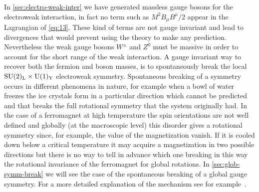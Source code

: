 In \cref{sec:electro-weak-inter} we have generated massless gauge bosons for the
electroweak interaction, in fact no term such as $M^{2} B_{\mu}B^{\mu} / 2$
appear in the Lagrangian of \cref{eq:13}. These kind of terms are not gauge
invariant and lead to divergences that would prevent using the theory to make
any prediction. Nevertheless the weak gauge bosons $W^\pm$ and $Z^0$ must be
massive in order to account for the short range of the weak interaction. A gauge
invariant way to recover both the fermion and boson masses, is to spontaneously
break the local $\mathrm{SU}(2)_\mathrm{L} \times \mathrm{U}(1)_\mathrm{Y}$ electroweak symmetry. Spontaneous
breaking of a symmetry occurs in different phenomena in nature, for example when
a bowl of water freezes the ice crystals form in a particular direction which
cannot be predicted and that breaks the full rotational symmetry that the system
originally had. In the case of a ferromagnet at high temperature the spin
orientations are not well defined and globally (at the macroscopic level) this
disorder gives a rotational symmetry since, for example, the value of the
magnetization vanish. If it is cooled down below a critical temperature it may
acquire a magnetization in two possible directions but there is no way to tell
in advance which one breaking in this way the rotational invariance of the
ferromagnet for global rotations. In \cref{sec:glob-symm-break} we will see the
case of the spontaneous breaking of a global gauge symmetry. For a more detailed
explanation of the mechanism see for example~\cite{martin:particle}.
